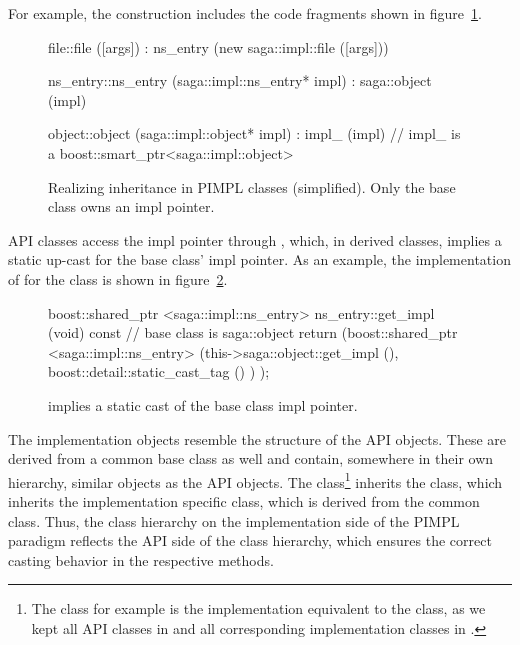 For example, the  construction includes the code
fragments shown in figure~\ref{src:implcon}.

\begin{figure}[!ht]
 \begin{center}
  \begin{mycode}[label=saga::file constructor]
  file::file ([args])
    : ns_entry (new saga::impl::file ([args]))
  { }
  \end{mycode}
  \begin{mycode}[label=saga::ns\_entry constructor, firstnumber=last]
  ns_entry::ns_entry (saga::impl::ns_entry* impl)
    : saga::object (impl)
  { }
  \end{mycode}
  \begin{mycode}[label=saga::object constructor, firstnumber=last]
  object::object (saga::impl::object* impl)
    : impl_ (impl) 
  //  impl_ is a boost::smart_ptr<saga::impl::object>
  { }
  \end{mycode}
  \up
  \up
  \caption{\label{src:implcon}
    Realizing inheritance in PIMPL classes (simplified).  Only the
     base class owns an impl pointer.}
 \end{center}
\end{figure}

API classes access the impl pointer through , which, in
derived classes, implies a static up-cast for the base class' impl
pointer.  As an example, the implementation of  for the
 class is shown in figure~\ref{src:getimpl}.  

\begin{figure}[!ht]
 \begin{center}
  \begin{mycode}[label=saga::ns\_entry.get\_impl() ]
  boost::shared_ptr <saga::impl::ns_entry> 
         ns_entry::get_impl (void) const
  { 
    // base class is saga::object
    return (boost::shared_ptr <saga::impl::ns_entry> 
              (this->saga::object::get_impl (), 
               boost::detail::static_cast_tag ()
           )  );
  }
  \end{mycode}
  \up
  \up
  \caption{\label{src:getimpl}
     implies a static cast of the base class impl
    pointer.}
 \end{center}
\end{figure}

The implementation objects resemble the structure of the API objects.
These are derived from a common base class as well and contain, somewhere 
in their own hierarchy, similar objects as the API objects. 
The  class\footnote{\small{The  
class for example is the implementation equivalent to the  class, as 
we kept all API classes in  and all corresponding 
implementation classes in .}} inherits the 
 class, which inherits the implementation 
specific  class, which is derived from the common 
 class.  Thus, the
class hierarchy on the implementation side of the PIMPL paradigm
reflects the API side of the class hierarchy, which ensures
the correct casting behavior in the  respective methods.


